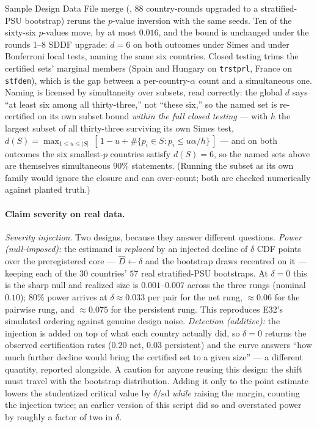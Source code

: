 \documentclass[12pt]{article}
\theoremstyle{definition}
\theoremstyle{remark}
\begin{document}
Sample Design Data File merge (, 88 country-rounds upgraded to
a stratified-PSU bootstrap) reruns the $p$-value inversion with the same
seeds. Ten of the sixty-six
$p$-values move, by at most $0.016$, and the bound is unchanged under the
rounds 1--8 SDDF upgrade: $d=6$ on both outcomes under Simes and under
Bonferroni local tests, naming the same six countries. Closed testing trims
the
certified sets' marginal members (Spain and Hungary on \texttt{trstprl}, France
on \texttt{stfdem}), which is the gap between a per-country-$\alpha$
count and a simultaneous one. Naming is licensed by simultaneity over
subsets, read correctly: the global $d$ says ``at least six among all
thirty-three,'' not ``these six,'' so the named set is re-certified on its own
subset bound \emph{within the full closed testing} --- with $h$ the largest
subset of all thirty-three surviving its own Simes test,
$d(S)=\max_{1\le u\le|S|}\,[\,1-u+\#\{p_i\in S: p_i\le u\alpha/h\}\,]$
\citep[the closure shortcut of][]{goeman2011multiple} --- and on both
outcomes the six smallest-$p$ countries satisfy $d(S)=6$, so the named sets
above are themselves simultaneous $90\%$ statements. (Running the subset as
its own family would ignore the closure and can over-count; both are checked
numerically against planted truth.)

\paragraph{Claim severity on real data.} \emph{Severity injection}. Two designs, because they answer different
questions. \emph{Power (null-imposed):} the estimand is \emph{replaced} by an
injected decline of $\delta$ CDF points over the preregistered core --- $\widehat
D\leftarrow\delta$ and the bootstrap draws recentred on it --- keeping each of the
$30$ countries' $57$ real stratified-PSU bootstraps. At $\delta=0$ this is the
sharp null and realized size is $0.001$--$0.007$ across the three rungs
(nominal $0.10$); $80\%$ power arrives at $\delta\approx0.033$ per pair for
the net rung, $\approx0.06$ for the pairwise rung, and $\approx0.075$ for the
persistent rung. This reproduces E32's simulated ordering against genuine
design noise.
\emph{Detection (additive):} the injection is added on top of what each country
actually did, so $\delta=0$ returns the observed certification rates ($0.20$ net,
$0.03$ persistent) and the curve answers ``how much further decline would bring
the certified set to a given size'' --- a different quantity, reported alongside.
A caution for anyone reusing this design: the shift must travel with the
bootstrap distribution. Adding it only to the point estimate lowers the
studentized critical value by $\delta/\mathrm{sd}$ \emph{while} raising the
margin, counting the injection twice; an earlier version of this script did so
and overstated power by roughly a factor of two in $\delta$.
\end{document}
